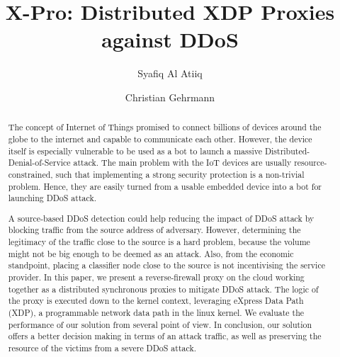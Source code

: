 \documentclass[sigplan,screen]{acmart}
\begin{document}
\title{X-Pro: Distributed XDP Proxies against DDoS}

\author{Syafiq Al Atiiq}
\author{Christian Gehrmann}

\begin{abstract}
The concept of Internet of Things promised to connect billions of devices around the globe to the internet and capable to communicate each other. However, the device itself is especially vulnerable to be used as a bot to launch a massive Distributed-Denial-of-Service attack. The main problem with the IoT devices are usually resource-constrained, such that implementing a strong security protection is a non-trivial problem. Hence, they are easily turned from a usable embedded device into a bot for launching DDoS attack. 

A source-based DDoS detection could help reducing the impact of DDoS attack by blocking traffic from the source address of adversary. However, determining the legitimacy of the traffic close to the source is a hard problem, because the volume might not be big enough to be deemed as an attack. Also, from the economic standpoint, placing a classifier node close to the source is not incentivising the service provider. In this paper, we present a reverse-firewall proxy on the cloud working together as a distributed synchronous proxies to mitigate DDoS attack. The logic of the proxy is executed down to the kernel context, leveraging eXpress Data Path (XDP), a programmable network data path in the linux kernel. We evaluate the performance of our solution from several point of view. In conclusion, our solution offers a better decision making in terms of an attack traffic, as well as preserving the resource of the victims from a severe DDoS attack.  
\end{abstract}
\end{document}
